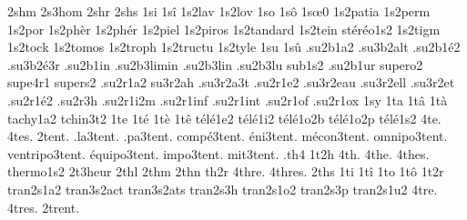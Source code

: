 {2shm
                    2s3hom
2shr
2shs
1si
1s\^i
                    1s2lav
                    1s2lov
1so
1s\^o
1s\oe0 %
                    1s2patia
                    1s2perm
                    1s2por
                    1s2ph\`er
                    1s2ph\'er
                    1s2piel
                    1s2piros
                    1s2tandard
                    1s2tein
                    st\'er\'eo1s2
                    1s2tigm
                    1s2tock
                    1s2tomos
                    1s2troph
                    1s2tructu
                    1s2tyle
1su
1s\^u
                    .su2b1a2
                    .su3b2alt
                    .su2b1\'e2
                    .su3b2\'e3r
                    .su2b1in
                    .su2b3limin
                    .su2b3lin
                    .su2b3lu
                    sub1s2
                    .su2b1ur
                    supero2
                    supe4r1
                    supers2
                    .su2r1a2
                    su3r2ah
                    .su3r2a3t
                    .su2r1e2
                    .su3r2eau
                    .su3r2ell
                    .su3r2et
                    .su2r1\'e2
                    .su2r3h
                    .su2r1i2m
                    .su2r1inf
                    .su2r1int
                    .su2r1of
                    .su2r1ox
1sy
1ta
1t\^a
1t\`a
                    tachy1a2
                    tchin3t2
1te
1t\'e
1t\`e
1t\^e
                    t\'el\'e1e2
                    t\'el\'e1i2
                    t\'el\'e1o2b
                    t\'el\'e1o2p
                    t\'el\'e1s2
4te.
4tes.
        2tent. %
     .la3tent.
     .pa3tent.
 comp\'e3tent.
   \'eni3tent.
 m\'econ3tent.
  omnipo3tent.
ventripo3tent.
\'equipo3tent.
    impo3tent.
     mit3tent.
%
.th4
1t2h
4th.
4the.
4thes.
                    thermo1s2
                    2t3heur
2thl %
2thm
2thn
th2r
4thre.
4thres.
2ths
1ti
1t\^i
1to
1t\^o
1t2r
                    tran2s1a2
                    tran3s2act
                    tran3s2ats
                    tran2s3h
                    tran2s1o2
                    tran2s3p
                    tran2s1u2
4tre.
4tres.
2trent. %
}
